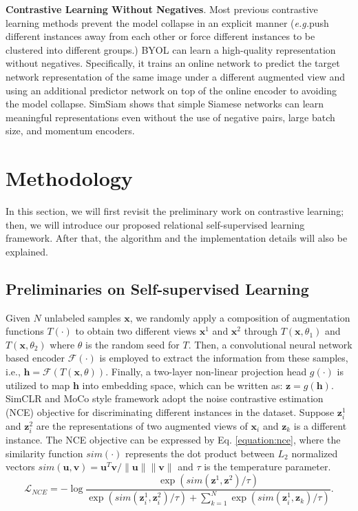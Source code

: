 \documentclass{article}
\newcommand{\<}{\left\langle}
\renewcommand{\>}{\right\rangle}
\newcommand{\eg}{{\emph{e.g.}}}
\begin{document}
\textbf{Contrastive Learning Without Negatives}. 
Most previous contrastive learning methods prevent the model collapse in an explicit manner (\eg push different instances away from each other or force different instances to be clustered into different groups.) BYOL \cite{byol} can learn a high-quality representation without negatives. Specifically, it trains an online network to predict the target network representation of the same image under a different augmented view and using an additional predictor network on top of the online encoder to avoiding the model collapse. SimSiam \cite{SimSiam} shows that simple Siamese networks can learn meaningful representations even without the use of negative pairs, large batch size, and momentum encoders.  
\label{section:method}
\section{Methodology}

In this section, we will first revisit the preliminary work on contrastive learning; then, we will introduce our proposed relational self-supervised learning framework. After that, the algorithm and the implementation details will also be explained.

\subsection{Preliminaries on Self-supervised Learning}
Given $N$ unlabeled samples $\mathbf{x}$, we randomly apply a composition of augmentation functions $T(\cdot)$ to obtain two different views $\mathbf{x}^{1}$ and $\mathbf{x}^{2}$ through $T(\mathbf{x}, \theta_{1})$ and $T(\mathbf{x}, \theta_{2})$ where $\theta$ is the random seed for $T$. Then, a convolutional neural network based encoder $\mathcal{F}(\cdot)$ is employed to extract the information from these samples, i.e.,   $\mathbf{h} = \mathcal{F}(T(\mathbf{x}, \theta))$. Finally, a two-layer non-linear projection head $g(\cdot)$ is utilized to map $\mathbf{h}$ into embedding space, which can be written as: $\mathbf{z} = g(\mathbf{h})$. SimCLR \cite{simclr} and MoCo \cite{moco} style framework adopt the noise contrastive estimation (NCE) objective for discriminating different instances in the dataset. Suppose $\mathbf{z}^{1}_{i}$ and $\mathbf{z}^{2}_{i}$ are the representations of two augmented views of $\mathbf{x}_{i}$ and $\mathbf{z}_{k}$ is a different instance. The NCE objective can be expressed by Eq. \eqref{equation:nce}, where the similarity function $sim(\cdot)$ represents the dot product between $L_2$ normalized vectors $sim(\mathbf{u}, \mathbf{v}) = \mathbf{u}^{T}\mathbf{v} / \lVert \mathbf{u} \lVert \lVert \mathbf{v} \lVert $ and $\tau$ is the temperature parameter. 
\vspace{-3pt}
\begin{equation}
    \label{equation:nce}
    \mathcal{L}_{NCE} = -\log \frac{\exp(sim(\mathbf{z}^{1}, \mathbf{z}^{2})/ \tau) }{ \exp(sim(\mathbf{z}_{i}^{1}, \mathbf{z}_{i}^{2}) / \tau ) + \sum_{k=1}^{N}  \exp(sim(\mathbf{z}_{i}^{1}, \mathbf{z}_{k}) / \tau ) }.
\end{equation}
\end{document}
